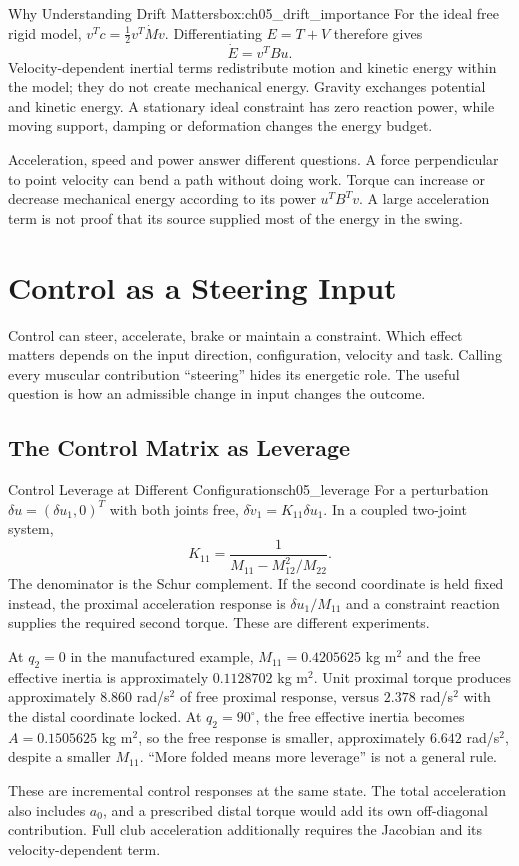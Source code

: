 \begin{laymansbox}{Why Understanding Drift Matters}{box:ch05_drift_importance}
For the ideal free rigid model, $v^Tc=\tfrac12v^T\dot Mv$. Differentiating $E=T+V$ therefore gives
\[
 \dot E=v^TBu.
\]
Velocity-dependent inertial terms redistribute motion and kinetic energy within the model; they do not create mechanical energy. Gravity exchanges potential and kinetic energy. A stationary ideal constraint has zero reaction power, while moving support, damping or deformation changes the energy budget.

Acceleration, speed and power answer different questions. A force perpendicular to point velocity can bend a path without doing work. Torque can increase or decrease mechanical energy according to its power $u^TB^Tv$. A large acceleration term is not proof that its source supplied most of the energy in the swing.
\end{laymansbox}

\section{Control as a Steering Input}
Control can steer, accelerate, brake or maintain a constraint. Which effect matters depends on the input direction, configuration, velocity and task. Calling every muscular contribution ``steering'' hides its energetic role. The useful question is how an admissible change in input changes the outcome.

\subsection*{The Control Matrix as Leverage}
\begin{example}{Control Leverage at Different Configurations}{ch05_leverage}
For a perturbation $\delta u=(\delta u_1,0)^T$ with both joints free, $\delta\dot v_1=K_{11}\delta u_1$. In a coupled two-joint system,
\[
 K_{11}=\frac{1}{M_{11}-M_{12}^2/M_{22}}.
\]
The denominator is the Schur complement. If the second coordinate is held fixed instead, the proximal acceleration response is $\delta u_1/M_{11}$ and a constraint reaction supplies the required second torque. These are different experiments.

At $q_2=0$ in the manufactured example, $M_{11}=0.4205625$ kg m$^2$ and the free effective inertia is approximately $0.1128702$ kg m$^2$. Unit proximal torque produces approximately $8.860$ rad/s$^2$ of free proximal response, versus $2.378$ rad/s$^2$ with the distal coordinate locked. At $q_2=90^\circ$, the free effective inertia becomes $A=0.1505625$ kg m$^2$, so the free response is smaller, approximately $6.642$ rad/s$^2$, despite a smaller $M_{11}$. ``More folded means more leverage'' is not a general rule.

These are incremental control responses at the same state. The total acceleration also includes $a_0$, and a prescribed distal torque would add its own off-diagonal contribution. Full club acceleration additionally requires the Jacobian and its velocity-dependent term.
\end{example}

